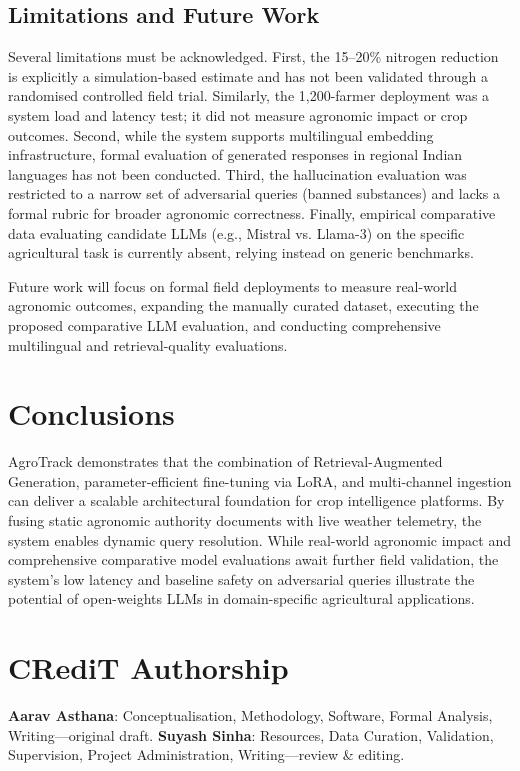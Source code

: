\documentclass[10pt,twocolumn,letterpaper]{article}
\begin{document}
\subsection{Limitations and Future Work}
Several limitations must be acknowledged. First, the 15–20\% nitrogen reduction is explicitly a simulation-based estimate and has not been validated through a randomised controlled field trial. Similarly, the 1,200-farmer deployment was a system load and latency test; it did not measure agronomic impact or crop outcomes. Second, while the system supports multilingual embedding infrastructure, formal evaluation of generated responses in regional Indian languages has not been conducted. Third, the hallucination evaluation was restricted to a narrow set of adversarial queries (banned substances) and lacks a formal rubric for broader agronomic correctness. Finally, empirical comparative data evaluating candidate LLMs (e.g., Mistral vs. Llama-3) on the specific agricultural task is currently absent, relying instead on generic benchmarks.

Future work will focus on formal field deployments to measure real-world agronomic outcomes, expanding the manually curated dataset, executing the proposed comparative LLM evaluation, and conducting comprehensive multilingual and retrieval-quality evaluations.

\section{Conclusions}
AgroTrack demonstrates that the combination of Retrieval-Augmented Generation, parameter-efficient fine-tuning via LoRA, and multi-channel ingestion can deliver a scalable architectural foundation for crop intelligence platforms. By fusing static agronomic authority documents with live weather telemetry, the system enables dynamic query resolution. While real-world agronomic impact and comprehensive comparative model evaluations await further field validation, the system's low latency and baseline safety on adversarial queries illustrate the potential of open-weights LLMs in domain-specific agricultural applications.

\section*{CRediT Authorship}
\textbf{Aarav Asthana}: Conceptualisation, Methodology, Software, Formal Analysis, Writing---original draft. \textbf{Suyash Sinha}: Resources, Data Curation, Validation, Supervision, Project Administration, Writing---review \& editing.
\end{document}
